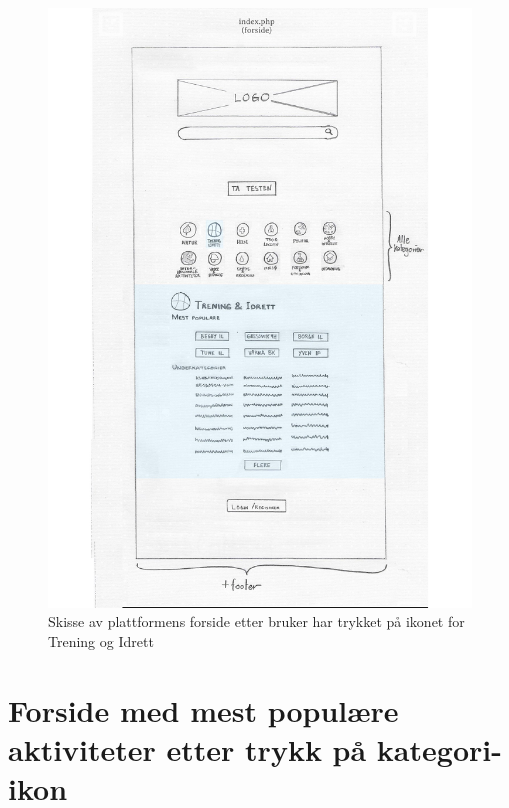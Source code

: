 \begin{figure}[H]
\centering
\includegraphics[width=.9\textwidth]{Illustrasjoner/Skisser-pdf/1.0/1-3-forside-utbrettsmeny.pdf}
\caption{Skisse av plattformens forside etter bruker har trykket på ikonet for Trening og Idrett}
\label{vedlegg:1-3-forside-utbrett}
\end{figure}

\section{Forside med mest populære aktiviteter etter trykk på kategori-ikon}

